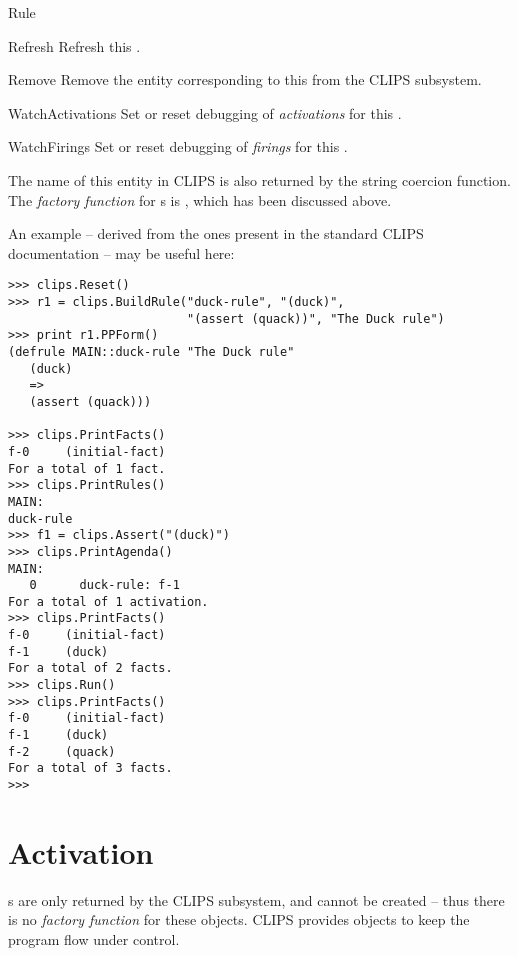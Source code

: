 \begin{classdesc*}{Rule}
\begin{methoddesc}{Refresh}{}
Refresh this .
\end{methoddesc}

\begin{methoddesc}{Remove}{}
Remove the entity corresponding to this  from the CLIPS
subsystem.
\end{methoddesc}

\begin{memberdesc}[property]{WatchActivations}
Set or reset debugging of \emph{activations} for this .
\end{memberdesc}

\begin{memberdesc}[property]{WatchFirings}
Set or reset debugging of \emph{firings} for this .
\end{memberdesc}

The name of this entity in CLIPS is also returned by the string coercion
function. The \emph{factory function} for s is
, which has been discussed above.

\end{classdesc*}

An example -- derived from the ones present in the standard CLIPS
documentation -- may be useful here:

\begin{verbatim}
>>> clips.Reset()
>>> r1 = clips.BuildRule("duck-rule", "(duck)",
                         "(assert (quack))", "The Duck rule")
>>> print r1.PPForm()
(defrule MAIN::duck-rule "The Duck rule"
   (duck)
   =>
   (assert (quack)))

>>> clips.PrintFacts()
f-0     (initial-fact)
For a total of 1 fact.
>>> clips.PrintRules()
MAIN:
duck-rule
>>> f1 = clips.Assert("(duck)")
>>> clips.PrintAgenda()
MAIN:
   0      duck-rule: f-1
For a total of 1 activation.
>>> clips.PrintFacts()
f-0     (initial-fact)
f-1     (duck)
For a total of 2 facts.
>>> clips.Run()
>>> clips.PrintFacts()
f-0     (initial-fact)
f-1     (duck)
f-2     (quack)
For a total of 3 facts.
>>>
\end{verbatim}



\section{Activation\label{pyclips-cl-Activation}}

 s are only returned by the CLIPS
subsystem, and cannot be created -- thus there is no \emph{factory
function} for these objects. CLIPS provides  objects
to keep the program flow under control.

